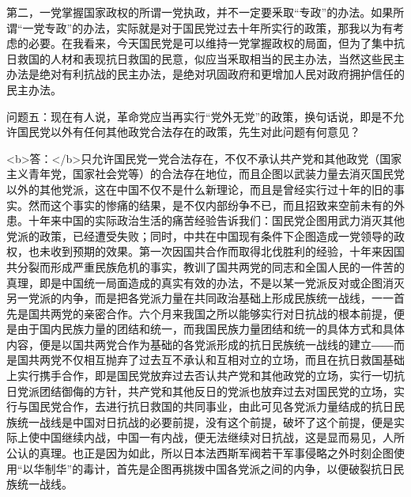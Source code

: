第二，一党掌握国家政权的所谓一党执政，并不一定要釆取“专政”的办法。如果所谓“一党专政”的办法，实际就是对于国民党过去十年所实行的政策，那我以为有考虑的必要。在我看来，今天国民党是可以维持一党掌握政权的局面，但为了集中抗日救国的人材和表现抗日救国的民意，似应当釆取相当的民主办法，当然这些民主办法是绝对有利抗战的民主办法，是绝对巩固政府和更增加人民对政府拥护信任的民主办法。

问题五：现在有人说，革命党应当再实行“党外无党”的政策，换句话说，即是不允许国民党以外有任何其他政党合法存在的政策，先生对此问题有何意见？

<b>答：</b>只允许国民党一党合法存在，不仅不承认共产党和其他政党（国家主义青年党，国家社会党等）的合法存在地位，而且企图以武装力量去消灭国民党以外的其他党派，这在中国不仅不是什么新理论，而且是曾经实行过十年的旧的事实。然而这个事实的惨痛的结果，是不仅内部纷争不已，而且招致来空前未有的外患。十年来中国的实际政治生活的痛苦经验告诉我们：国民党企图用武力消灭其他党派的政策，已经遭受失败；同时，中共在中国现有条件下企图造成一党领导的政权，也未收到预期的效果。第一次因国共合作而取得北伐胜利的经验，十年来因国共分裂而形成严重民族危机的事实，教训了国共两党的同志和全国人民的一件苦的真理，即是中国统一局面造成的真实有效的办法，不是以某一党派反对或企图消灭另一党派的内争，而是把各党派力量在共同政治基础上形成民族统一战线，一一首先是国共两党的亲密合作。六个月来我国之所以能够实行对日抗战的根本前提，便是由于国内民族力量的团结和统一，而我国民族力量团结和统一的具体方式和具体内容，便是以国共两党合作为基础的各党派形成的抗日民族统一战线的建立――而是国共两党不仅相互抛弃了过去互不承认和互相对立的立场，而且在抗日救国基础上实行携手合作，即是国民党放弃过去否认共产党和其他政党的立场，实行一切抗日党派团结御侮的方针，共产党和其他反日的党派也放弃过去对国民党的立场，实行与国民党合作，去进行抗日救国的共同事业，由此可见各党派力量结成的抗日民族统一战线是中国对日抗战的必要前提，没有这个前提，破坏了这个前提，便是实际上使中国继续内战，中国一有内战，便无法继续对日抗战，这是显而易见，人所公认的真理。也正是因为如此，所以日本法西斯军阀若干军事侵略之外时刻企图使用“以华制华”的毒计，首先是企图再挑拨中国各党派之间的内争，以便破裂抗日民族统一战线。

